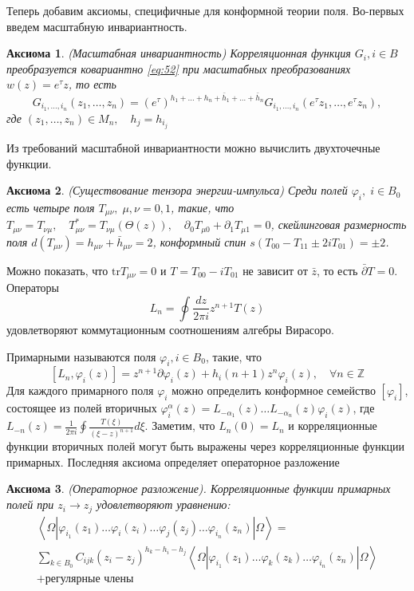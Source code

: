 \documentclass[12pt]{article}
\newtheorem{axiom}{Аксиома}
\begin{document}
Теперь добавим аксиомы, специфичные для конформной теории поля. Во-первых введем масштабную
инвариантность.
\begin{axiom}
  (Масштабная инвариантность) Корреляционная функция $G_{i}, i\in B$ преобразуется ковариантно
  \eqref{eq:52} при масштабных преобразованиях $w(z)=e^{\tau}z$, то есть
  \begin{equation}
    \label{eq:58}
    G_{i_{1},\dots,i_{n}}(z_{1},\dots,z_{n})=\left(e^{\tau}\right)^{h_{1}+\dots+h_{n}+\bar{h}_{1}+\dots+\bar{h}_{n}} 
    G_{i_{1},\dots,i_{n}}(e^{\tau} z_{1},\dots,e^{\tau} z_{n}),
  \end{equation}
  где $(z_{1},\dots,z_{n})\in M_{n},\quad h_{j}=h_{i_{j}}$
\end{axiom}
Из требований масштабной инвариантности можно вычислить двухточечные функции. 
\begin{axiom}
  (Существование тензора энергии-импульса) Среди полей $\varphi_{i},\; i\in B_{0}$ есть четыре поля
  $T_{\mu\nu},\; \mu,\nu=0,1$, такие, что $T_{\mu\nu}=T_{\nu\mu},\quad
  T_{\mu\nu}^{*}=T_{\nu\mu}(\Theta(z)),\quad \partial_{0} T_{\mu 0}+\partial_{1}T_{\mu 1}=0$,
  скейлинговая размерность поля $d(T_{\mu\nu})=h_{\mu\nu}+\bar{h}_{\mu\nu}=2$, конформный спин
  $s(T_{00}-T_{11}\pm 2i T_{01})=\pm 2$.
\end{axiom}
Можно показать, что $\mathrm{tr} T_{\mu\nu}=0$ и $T=T_{00}-i T_{01}$ не зависит от $\bar z$, то есть
$\bar \partial T=0$. Операторы
\begin{equation}
  \label{eq:59}
    L_{n}=\oint \frac{dz}{2\pi i} z^{n+1} T(z)
\end{equation}
удовлетворяют коммутационным соотношениям алгебры Вирасоро. 

Примарными называются поля $\varphi_{i}, i\in B_{0}$, такие, что
\begin{equation}
  \label{eq:60}
  [L_{n}, \varphi_{i}(z)]=z^{n+1}\partial \varphi_{i}(z)+h_{i}(n+1)z^{n}\varphi_{i}(z),\quad \forall n\in\mathbb{Z}
\end{equation}
Для каждого примарного поля $\varphi_{i}$ можно определить конформное семейство $[\varphi_{i}]$,
состоящее из полей вторичных $\varphi_{i}^{\alpha}(z)=L_{-\alpha_{1}}(z)\dots
L_{-\alpha_{n}}(z)\varphi_{i}(z)$, где $L_{-n}(z)=\frac{1}{2\pi i}\oint\frac{T(\xi)}{(\xi-z)^{n+1}}
d\xi$. Заметим, что $L_{n}(0)=L_{n}$ и корреляционные функции вторичных полей могут быть выражены
через корреляционные функции примарных. Последняя аксиома определяет операторное разложение
\begin{axiom}
  (Операторное разложение). Корреляционные функции примарных полей при $z_{i}\to z_{j}$
  удовлетворяют уравнению:
\begin{multline}
  \label{eq:61}
  \left<\Omega|\varphi_{i_{1}}(z_{1})\dots\varphi_{i}(z_{i})\dots \varphi_{j}(z_{j})\dots \varphi_{i_{n}}(z_{n})|\Omega\right>=\\
  \sum_{k\in B_{0}}C_{ijk} (z_{i}-z_{j})^{h_{k}-h_{i}-h_{j}} \left<\Omega|\varphi_{i_{1}}(z_{1})\dots\varphi_{k}(z_{k})\dots \varphi_{i_{n}}(z_{n})|\Omega\right>\\
  +\mbox{регулярные члены}
\end{multline}

\end{axiom}
\end{document}
